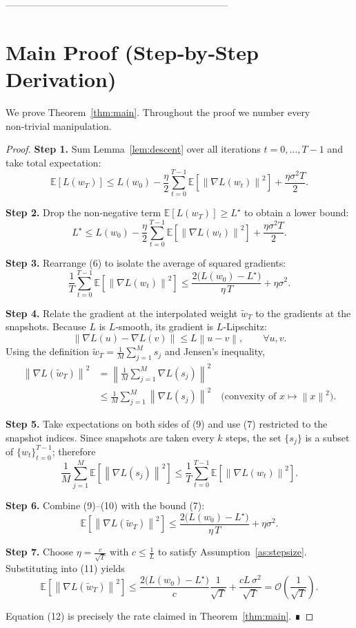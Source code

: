 \documentclass{article}
\newcommand{\E}{\mathbb{E}}
\newcommand{\norm}[1]{\left\lVert #1\right\rVert}
\begin{document}
---------------------------------------------------------------------

\section*{Main Proof (Step‑by‑Step Derivation)}
We prove Theorem~\ref{thm:main}. Throughout the proof we number every non‑trivial manipulation.

\begin{proof}
\textbf{Step 1.}  Sum Lemma~\ref{lem:descent} over all iterations $t=0,\dots,T-1$ and take total expectation:
\[
\E\!\left[L(w_T)\right]
\le L(w_0)-\frac{\eta}{2}\sum_{t=0}^{T-1}\E\!\left[\norm{\nabla L(w_t)}^2\right]
+\frac{\eta\sigma^2 T}{2}. \tag{5}
\]

\textbf{Step 2.}  Drop the non‑negative term $\E[L(w_T)]\ge L^\star$ to obtain a lower bound:
\[
L^\star\le L(w_0)-\frac{\eta}{2}\sum_{t=0}^{T-1}\E\!\left[\norm{\nabla L(w_t)}^2\right]
+\frac{\eta\sigma^2 T}{2}. \tag{6}
\]

\textbf{Step 3.}  Rearrange (6) to isolate the average of squared gradients:
\[
\frac{1}{T}\sum_{t=0}^{T-1}\E\!\left[\norm{\nabla L(w_t)}^2\right]
\le \frac{2\big(L(w_0)-L^\star\big)}{\eta\,T}
+\eta\sigma^2 . \tag{7}
\]

\textbf{Step 4.}  Relate the gradient at the interpolated weight $\widetilde w_T$ to the gradients at the snapshots.
Because $L$ is $L$‑smooth, its gradient is $L$‑Lipschitz:
\[
\norm{\nabla L(u)-\nabla L(v)}\le L\norm{u-v},\qquad\forall u,v. \tag{8}
\]
Using the definition $\widetilde w_T=\frac1M\sum_{j=1}^{M}s_j$ and Jensen’s inequality,
\[
\begin{aligned}
\norm{\nabla L(\widetilde w_T)}^2
&=\norm{\frac1M\sum_{j=1}^{M}\nabla L(s_j)}^2 \\
&\le \frac1M\sum_{j=1}^{M}\norm{\nabla L(s_j)}^2
   \quad\text{(convexity of $x\mapsto \norm{x}^2$)}. \tag{9}
\end{aligned}
\]

\textbf{Step 5.}  Take expectations on both sides of (9) and use (7) restricted to the snapshot indices.
Since snapshots are taken every $k$ steps, the set $\{s_j\}$ is a subset of $\{w_t\}_{t=0}^{T-1}$; therefore
\[
\frac1M\sum_{j=1}^{M}\E\!\left[\norm{\nabla L(s_j)}^2\right]
\le \frac1T\sum_{t=0}^{T-1}\E\!\left[\norm{\nabla L(w_t)}^2\right]. \tag{10}
\]

\textbf{Step 6.}  Combine (9)–(10) with the bound (7):
\[
\E\!\left[\norm{\nabla L(\widetilde w_T)}^2\right]
\le \frac{2\big(L(w_0)-L^\star\big)}{\eta\,T}
+\eta\sigma^2 . \tag{11}
\]

\textbf{Step 7.}  Choose $\eta = \frac{c}{\sqrt{T}}$ with $c\le \frac{1}{L}$ to satisfy Assumption~\ref{as:stepsize}. Substituting into (11) yields
\[
\E\!\left[\norm{\nabla L(\widetilde w_T)}^2\right]
\le \frac{2\big(L(w_0)-L^\star\big)}{c}\frac{1}{\sqrt{T}}
+\frac{cL\,\sigma^2}{\sqrt{T}}
= \mathcal{O}\!\left(\frac{1}{\sqrt{T}}\right). \tag{12}
\]

Equation (12) is precisely the rate claimed in Theorem~\ref{thm:main}. ∎
\end{proof}
\end{document}
